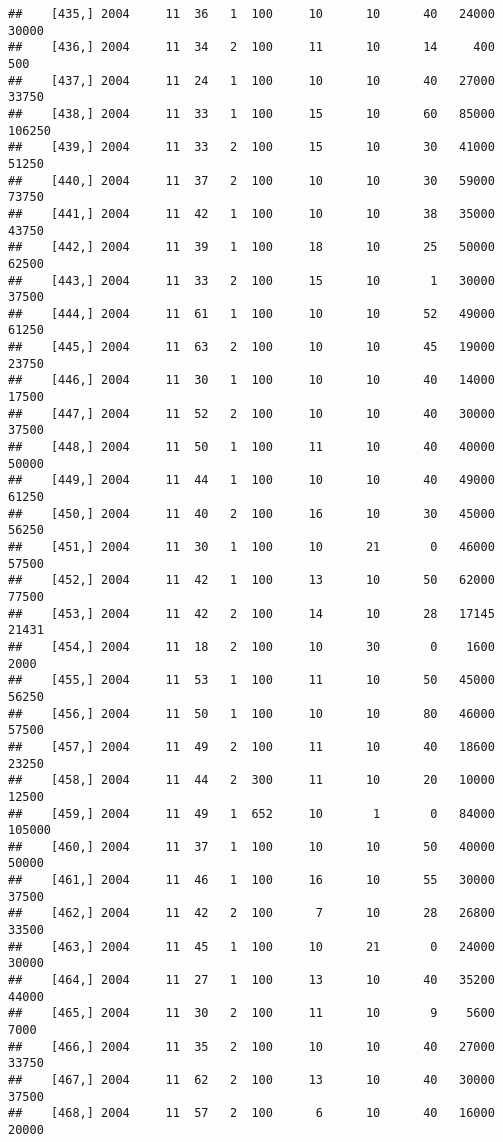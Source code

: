 \documentclass{article}\usepackage[]{graphicx}\usepackage[]{color}
\makeatletter
\newenvironment{kframe}{%
 \def\at@end@of@kframe{}%
 \ifinner\ifhmode%
  \def\at@end@of@kframe{\end{minipage}}%
  \begin{minipage}{\columnwidth}%
 \fi\fi%
 \def\FrameCommand##1{\hskip\@totalleftmargin \hskip-\fboxsep
 \colorbox{shadecolor}{##1}\hskip-\fboxsep
     \hskip-\linewidth \hskip-\@totalleftmargin \hskip\columnwidth}%
 \MakeFramed {\advance\hsize-\width
   \@totalleftmargin\z@ \linewidth\hsize
   \@setminipage}}%
 {\par\unskip\endMakeFramed%
 \at@end@of@kframe}
\newenvironment{knitrout}{}{} %
\makeatother
\begin{document}
\begin{knitrout}
\begin{kframe}
\begin{verbatim}
##    [435,] 2004     11  36   1  100     10      10      40   24000   30000
##    [436,] 2004     11  34   2  100     11      10      14     400     500
##    [437,] 2004     11  24   1  100     10      10      40   27000   33750
##    [438,] 2004     11  33   1  100     15      10      60   85000  106250
##    [439,] 2004     11  33   2  100     15      10      30   41000   51250
##    [440,] 2004     11  37   2  100     10      10      30   59000   73750
##    [441,] 2004     11  42   1  100     10      10      38   35000   43750
##    [442,] 2004     11  39   1  100     18      10      25   50000   62500
##    [443,] 2004     11  33   2  100     15      10       1   30000   37500
##    [444,] 2004     11  61   1  100     10      10      52   49000   61250
##    [445,] 2004     11  63   2  100     10      10      45   19000   23750
##    [446,] 2004     11  30   1  100     10      10      40   14000   17500
##    [447,] 2004     11  52   2  100     10      10      40   30000   37500
##    [448,] 2004     11  50   1  100     11      10      40   40000   50000
##    [449,] 2004     11  44   1  100     10      10      40   49000   61250
##    [450,] 2004     11  40   2  100     16      10      30   45000   56250
##    [451,] 2004     11  30   1  100     10      21       0   46000   57500
##    [452,] 2004     11  42   1  100     13      10      50   62000   77500
##    [453,] 2004     11  42   2  100     14      10      28   17145   21431
##    [454,] 2004     11  18   2  100     10      30       0    1600    2000
##    [455,] 2004     11  53   1  100     11      10      50   45000   56250
##    [456,] 2004     11  50   1  100     10      10      80   46000   57500
##    [457,] 2004     11  49   2  100     11      10      40   18600   23250
##    [458,] 2004     11  44   2  300     11      10      20   10000   12500
##    [459,] 2004     11  49   1  652     10       1       0   84000  105000
##    [460,] 2004     11  37   1  100     10      10      50   40000   50000
##    [461,] 2004     11  46   1  100     16      10      55   30000   37500
##    [462,] 2004     11  42   2  100      7      10      28   26800   33500
##    [463,] 2004     11  45   1  100     10      21       0   24000   30000
##    [464,] 2004     11  27   1  100     13      10      40   35200   44000
##    [465,] 2004     11  30   2  100     11      10       9    5600    7000
##    [466,] 2004     11  35   2  100     10      10      40   27000   33750
##    [467,] 2004     11  62   2  100     13      10      40   30000   37500
##    [468,] 2004     11  57   2  100      6      10      40   16000   20000

\end{verbatim}
\end{kframe}
\end{knitrout}
\end{document}
